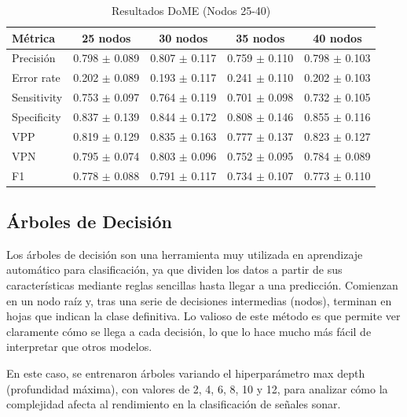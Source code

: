 \documentclass[a4paper,10pt]{article}
\begin{document}
    \begin{table}[h!]
    \centering
    \caption{Resultados DoME (Nodos 25-40)}
    \begin{tabular}{lcccc}
    \toprule
    Métrica & 25 nodos & 30 nodos & 35 nodos & 40 nodos \\
    \midrule
    Precisión & 0.798 $\pm$ 0.089 & 0.807 $\pm$ 0.117 & 0.759 $\pm$ 0.110 & 0.798 $\pm$ 0.103 \\
    Error rate & 0.202 $\pm$ 0.089 & 0.193 $\pm$ 0.117 & 0.241 $\pm$ 0.110 & 0.202 $\pm$ 0.103 \\
    Sensitivity & 0.753 $\pm$ 0.097 & 0.764 $\pm$ 0.119 & 0.701 $\pm$ 0.098 & 0.732 $\pm$ 0.105 \\
    Specificity & 0.837 $\pm$ 0.139 & 0.844 $\pm$ 0.172 & 0.808 $\pm$ 0.146 & 0.855 $\pm$ 0.116 \\
    VPP & 0.819 $\pm$ 0.129 & 0.835 $\pm$ 0.163 & 0.777 $\pm$ 0.137 & 0.823 $\pm$ 0.127 \\
    VPN & 0.795 $\pm$ 0.074 & 0.803 $\pm$ 0.096 & 0.752 $\pm$ 0.095 & 0.784 $\pm$ 0.089 \\
    F1 & 0.778 $\pm$ 0.088 & 0.791 $\pm$ 0.117 & 0.734 $\pm$ 0.107 & 0.773 $\pm$ 0.110 \\
    \bottomrule
    \end{tabular}
    \label{tab:dome_25_40}
    \end{table}
    \subsection{Árboles de Decisión}
    Los árboles de decisión son una herramienta muy utilizada en aprendizaje automático para clasificación, ya que dividen los datos a partir de sus características mediante reglas sencillas hasta llegar a una predicción. Comienzan en un nodo raíz y, tras una serie de decisiones intermedias (nodos), terminan en hojas que indican la clase definitiva. Lo valioso de este método es que permite ver claramente cómo se llega a cada decisión, lo que lo hace mucho más fácil de interpretar que otros modelos. 
    
    En este caso, se entrenaron árboles variando el hiperparámetro max depth (profundidad máxima), con valores de 2, 4, 6, 8, 10 y 12, para analizar cómo la complejidad afecta al rendimiento en la clasificación de señales sonar.
    
\end{document}
